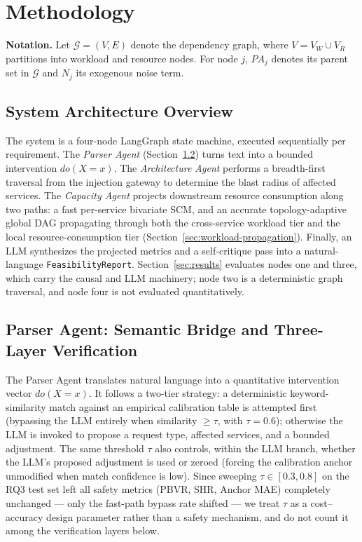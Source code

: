 \documentclass[journal, 10pt]{IEEEtran}
\begin{document}
\section{Methodology}
\label{sec:methodology}

\textbf{Notation.} Let $\mathcal{G} = (V, E)$ denote the dependency graph, where $V = V_W \cup V_R$ partitions into workload and resource nodes. For node $j$, $PA_j$ denotes its parent set in $\mathcal{G}$ and $N_j$ its exogenous noise term.

\subsection{System Architecture Overview}
The system is a four-node LangGraph state machine, executed sequentially per requirement. The \emph{Parser Agent} (Section~\ref{sec:parser-agent}) turns text into a bounded intervention $do(X{=}x)$. The \emph{Architecture Agent} performs a breadth-first traversal from the injection gateway to determine the blast radius of affected services. The \emph{Capacity Agent} projects downstream resource consumption along two paths: a fast per-service bivariate SCM, and an accurate topology-adaptive global DAG propagating through both the cross-service workload tier and the local resource-consumption tier (Section~\ref{sec:workload-propagation}). Finally, an LLM synthesizes the projected metrics and a self-critique pass into a natural-language \texttt{FeasibilityReport}. Section~\ref{sec:results} evaluates nodes one and three, which carry the causal and LLM machinery; node two is a deterministic graph traversal, and node four is not evaluated quantitatively.

\subsection{Parser Agent: Semantic Bridge and Three-Layer Verification}
\label{sec:parser-agent}
The Parser Agent translates natural language into a quantitative intervention vector $do(X=x)$. It follows a two-tier strategy: a deterministic keyword-similarity match against an empirical calibration table is attempted first (bypassing the LLM entirely when similarity $\geq \tau$, with $\tau = 0.6$); otherwise the LLM is invoked to propose a request type, affected services, and a bounded adjustment. The same threshold $\tau$ also controls, within the LLM branch, whether the LLM's proposed adjustment is used or zeroed (forcing the calibration anchor unmodified when match confidence is low). Since sweeping $\tau \in [0.3, 0.8]$ on the RQ3 test set left all safety metrics (PBVR, SHR, Anchor MAE) completely unchanged --- only the fast-path bypass rate shifted --- we treat $\tau$ as a cost--accuracy design parameter rather than a safety mechanism, and do not count it among the verification layers below.
\end{document}
